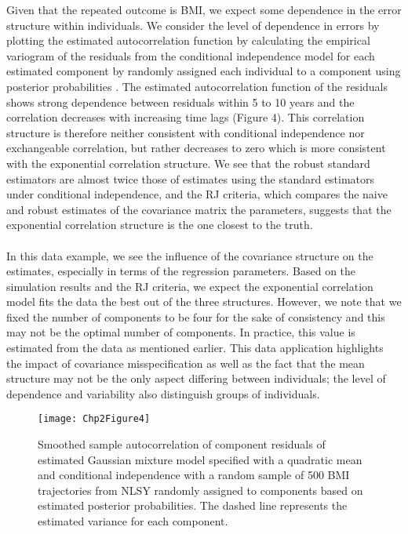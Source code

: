 \documentclass[10pt]{article}
\begin{document}
Given that the repeated outcome is BMI, we expect some dependence in the error structure within individuals.  We consider the level of dependence in errors by plotting the estimated autocorrelation function by calculating the empirical variogram of the residuals from the conditional independence model \cite{diggle2002} for each estimated component by randomly assigned each individual to a component using posterior probabilities \cite{wang2005}. The estimated autocorrelation function of the residuals shows strong dependence between residuals within 5 to 10 years and the correlation decreases with increasing time lags (Figure 4). This correlation structure is therefore neither consistent with conditional independence nor exchangeable correlation, but rather decreases to zero which is more consistent with the exponential correlation structure. We see that the robust standard estimators are almost twice those of estimates using the standard estimators under conditional independence, and the RJ criteria, which compares the naive and robust estimates of the covariance matrix the parameters, suggests that the exponential correlation structure is the one closest to the truth. \\\\
 In this data example, we see the influence of the covariance structure on the estimates, especially in terms of the regression parameters. Based on the simulation results and the RJ criteria, we expect the exponential correlation model fits the data the best out of the three structures. However, we note that we fixed the number of components to be four for the sake of consistency and this may not be the optimal number of components. In practice, this value is estimated from the data as mentioned earlier. This data application highlights the impact of covariance misspecification as well as the fact that the mean structure may not be the only aspect differing between individuals; the level of dependence and variability also distinguish groups of individuals. 
\begin{figure}
\begin{center}
\texttt{[image: Chp2Figure4]}
\end{center}
\caption{Smoothed sample autocorrelation of component residuals of estimated Gaussian mixture model specified with a quadratic mean and conditional independence with a random sample of 500 BMI trajectories from NLSY randomly assigned to components based on estimated posterior probabilities. The dashed line represents the estimated variance for each component. }
\label{fig:4}
\end{figure}
\end{document}
